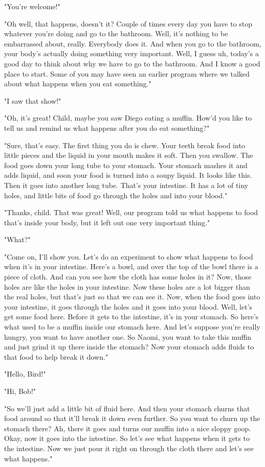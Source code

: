 "You're welcome!"

"Oh well, that happens, doesn't it? Couple of times every day you have to stop whatever you're doing and go to the bathroom. Well, it's nothing to be embarrassed about, really. Everybody does it. And when you go to the bathroom, your body's actually doing something very important. Well, I guess uh, today's a good day to think about why we have to go to the bathroom. And I know a good place to start. Some of you may have seen an earlier program where we talked about what happens when you eat something."

"I saw that show!"

"Oh, it's great! Child, maybe you saw Diego eating a muffin. How'd you like to tell us and remind us what happens after you do eat something?"

"Sure, that's easy. The first thing you do is chew. Your teeth break food into little pieces and the liquid in your mouth makes it soft. Then you swallow. The food goes down your long tube to your stomach. Your stomach mashes it and adds liquid, and soon your food is turned into a soupy liquid. It looks like this. Then it goes into another long tube. That's your intestine. It has a lot of tiny holes, and little bits of food go through the holes and into your blood."

"Thanks, child. That was great! Well, our program told us what happens to food that's inside your body, but it left out one very important thing."

"What?"

"Come on, I'll show you. Let's do an experiment to show what happens to food when it's in your intestine. Here's a bowl, and over the top of the bowl there is a piece of cloth. And can you see how the cloth has some holes in it? Now, those holes are like the holes in your intestine. Now these holes are a lot bigger than the real holes, but that's just so that we can see it. Now, when the food goes into your intestine, it goes through the holes and it goes into your blood. Well, let's get some food here. Before it gets to the intestine, it's in your stomach. So here's what used to be a muffin inside our stomach here. And let's suppose you're really hungry, you want to have another one. So Naomi, you want to take this muffin and just grind it up there inside the stomach? Now your stomach adds fluids to that food to help break it down."

"Hello, Bird!"

"Hi, Bob!"

"So we'll just add a little bit of fluid here. And then your stomach churns that food around so that it'll break it down even further. So you want to churn up the stomach there? Ah, there it goes and turns our muffin into a nice sloppy goop. Okay, now it goes into the intestine. So let's see what happens when it gets to the intestine. Now we just pour it right on through the cloth there and let's see what happens."

